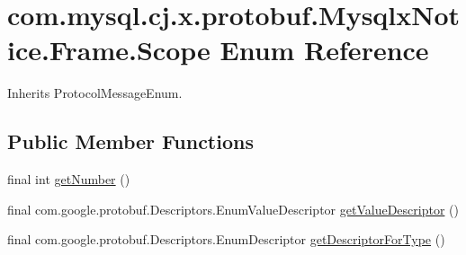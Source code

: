 \hypertarget{enumcom_1_1mysql_1_1cj_1_1x_1_1protobuf_1_1_mysqlx_notice_1_1_frame_1_1_scope}{}\section{com.\+mysql.\+cj.\+x.\+protobuf.\+Mysqlx\+Notice.\+Frame.\+Scope Enum Reference}
\label{enumcom_1_1mysql_1_1cj_1_1x_1_1protobuf_1_1_mysqlx_notice_1_1_frame_1_1_scope}


Inherits Protocol\+Message\+Enum.

\subsection*{Public Member Functions}
\begin{DoxyCompactItemize}
\item 
final int \mbox{\hyperlink{enumcom_1_1mysql_1_1cj_1_1x_1_1protobuf_1_1_mysqlx_notice_1_1_frame_1_1_scope_a1938b2ebbbe401e25aadc70eb98a3432}{get\+Number}} ()
\item 
final com.\+google.\+protobuf.\+Descriptors.\+Enum\+Value\+Descriptor \mbox{\hyperlink{enumcom_1_1mysql_1_1cj_1_1x_1_1protobuf_1_1_mysqlx_notice_1_1_frame_1_1_scope_a879e09fd5e196310c6cb4e8562d1dc55}{get\+Value\+Descriptor}} ()
\item 
final com.\+google.\+protobuf.\+Descriptors.\+Enum\+Descriptor \mbox{\hyperlink{enumcom_1_1mysql_1_1cj_1_1x_1_1protobuf_1_1_mysqlx_notice_1_1_frame_1_1_scope_a39037c262b16a806f02ddf6706ddc3ad}{get\+Descriptor\+For\+Type}} ()
\end{DoxyCompactItemize}

